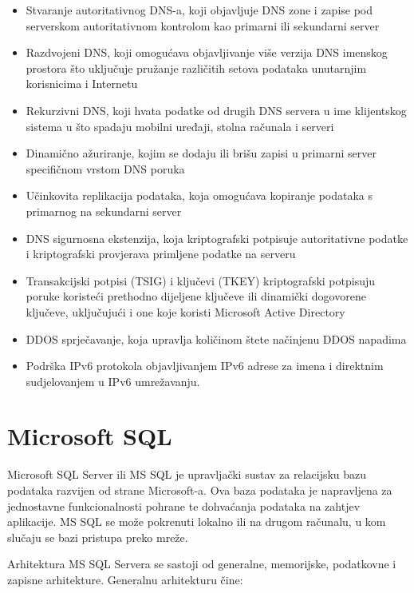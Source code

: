 \documentclass[12pt, oneside, onecolumn]{book}
\begin{document}
{\begin{itemize}
\item Stvaranje autoritativnog DNS-a, koji objavljuje DNS zone i zapise pod serverskom autoritativnom kontrolom kao primarni ili sekundarni server
\item Razdvojeni DNS, koji omogućava objavljivanje više verzija DNS imenskog prostora što uključuje pružanje različitih setova podataka unutarnjim korisnicima i Internetu
\item Rekurzivni DNS, koji hvata podatke od drugih DNS servera u ime klijentskog sistema u što spadaju mobilni uređaji, stolna računala i serveri
\item Dinamično ažuriranje, kojim se dodaju ili brišu zapisi u primarni server specifičnom vrstom DNS poruka
\item Učinkovita replikacija podataka, koja omogućava kopiranje podataka s primarnog na sekundarni server
\item DNS sigurnosna ekstenzija, koja kriptografski potpisuje autoritativne podatke i kriptografski provjerava primljene podatke na serveru
\item Transakcijski potpisi (TSIG) i ključevi (TKEY) kriptografski potpisuju poruke koristeći prethodno dijeljene ključeve ili dinamički dogovorene ključeve, uključujući i one koje koristi Microsoft Active Directory
\item DDOS sprječavanje, koja upravlja količinom štete načinjenu DDOS napadima
\item Podrška IPv6 protokola objavljivanjem IPv6 adrese za imena i direktnim sudjelovanjem u IPv6 umrežavanju.
\end{itemize}

\section{Microsoft SQL}
Microsoft SQL Server ili MS SQL je upravljački sustav za relacijsku bazu podataka razvijen od strane Microsoft-a. Ova baza podataka je napravljena za jednostavne funkcionalnosti pohrane te dohvaćanja podataka na zahtjev aplikacije. MS SQL se može pokrenuti lokalno ili na drugom računalu, u kom slučaju se bazi pristupa preko mreže.

Arhitektura MS SQL Servera se sastoji od generalne, memorijske, podatkovne i zapisne arhitekture. Generalnu arhitekturu čine:

}
\end{document}
